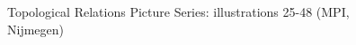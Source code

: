 \begin{figure}
\qquad
{}
\caption[TRPS 25-48]{Topological Relations Picture Series: illustrations 25-48
(\textcopyright MPI, Nijmegen)
  \cite[572-73]{Levi06}  \label{fig:TRPS-25-48}}
\end{figure} 



